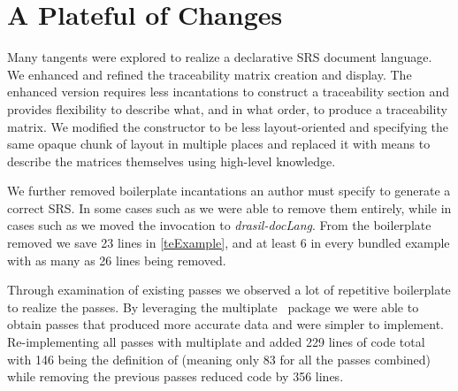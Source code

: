 

\section{A Plateful of Changes}\label{dlDone}
Many tangents were explored to realize a declarative SRS document language. We enhanced and refined the traceability matrix creation and display. The enhanced version requires less incantations to construct a traceability section and provides flexibility to describe what, and in what order, to produce a traceability matrix. We modified the constructor to be less layout-oriented and specifying the same opaque chunk of layout in multiple places and replaced it with means to describe the matrices themselves using high-level knowledge.

We further removed boilerplate incantations an author must specify to generate a correct SRS. In some cases such as  we were able to remove them entirely, while in cases such as  we moved the invocation to \textit{drasil-docLang}. From the boilerplate removed we save 23 lines in \autoref{teExample}, and at least 6 in every bundled example with as many as 26 lines being removed. 

Through examination of existing passes we observed a lot of repetitive boilerplate to realize the passes. By leveraging the multiplate~\cite{multiplate} package we were able to obtain passes that produced more accurate data and were simpler to implement. Re-implementing all passes with multiplate and  added 229 lines of code total with 146 being the definition of  (meaning only 83 for all the passes combined) while removing the previous passes reduced code by 356 lines.

